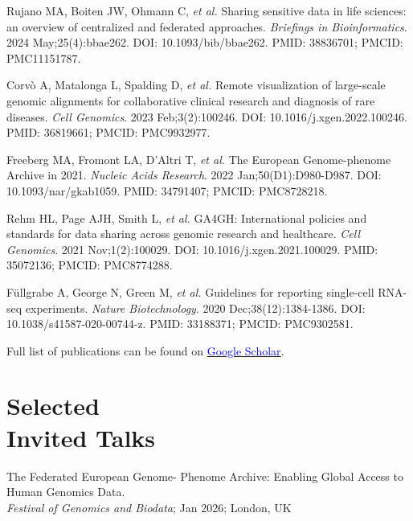 \documentclass[margin,line]{res}
\begin{document}
\begin{resume}


Rujano MA, Boiten JW, Ohmann C, {\em et al.} Sharing sensitive data in life sciences: an overview of centralized and federated approaches. {\em Briefings in Bioinformatics}. 2024 May;25(4):bbae262. DOI: 10.1093/bib/bbae262. PMID: 38836701; PMCID: PMC11151787.

Corvò A, Matalonga L, Spalding D, {\em et al.} Remote visualization of large-scale genomic alignments for collaborative clinical research and diagnosis of rare diseases. {\em Cell Genomics}. 2023 Feb;3(2):100246. DOI: 10.1016/j.xgen.2022.100246. PMID: 36819661; PMCID: PMC9932977.

Freeberg MA, Fromont LA, D'Altri T, {\em et al.} The European Genome-phenome Archive in 2021. {\em Nucleic Acids Research}. 2022 Jan;50(D1):D980-D987. DOI: 10.1093/nar/gkab1059. PMID: 34791407; PMCID: PMC8728218.

Rehm HL, Page AJH, Smith L, {\em et al.} GA4GH: International policies and standards for data sharing across genomic research and healthcare. {\em Cell Genomics}. 2021 Nov;1(2):100029. DOI: 10.1016/j.xgen.2021.100029. PMID: 35072136; PMCID: PMC8774288.

Füllgrabe A, George N, Green M, {\em et al.} Guidelines for reporting single-cell RNA-seq experiments. {\em Nature Biotechnology}. 2020 Dec;38(12):1384-1386. DOI: 10.1038/s41587-020-00744-z. PMID: 33188371; PMCID: PMC9302581.

\Rightarrow  Full list of publications can be found on \href{https://scholar.google.com/citations?user=2LCcJA0AAAAJ&hl=en}{\textcolor{blue}{Google Scholar}}.

\section{\sc Selected\\ Invited Talks}

The Federated European Genome- Phenome Archive: Enabling Global Access to Human Genomics Data. \\
{\em Festival of Genomics and Biodata}; Jan 2026; London, UK


\end{resume}
\end{document}
